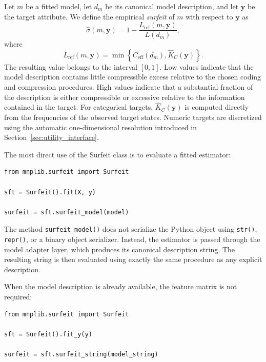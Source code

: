 Let $m$ be a fitted model, let $d_m$ be its canonical model description, and let $\mathbf{y}$ be the target attribute. We define the empirical \emph{surfeit} of $m$ with respect to $\mathbf{y}$ as
\[
\hat\sigma(m,\mathbf{y}) = 1 - \frac{L_{\mathrm{ref}}(m,\mathbf{y})}{L(d_m)},
\]
where
\[
L_{\mathrm{ref}}(m,\mathbf{y}) = \min\left\{C_{\mathrm{eff}}(d_m), \hat K_C(\mathbf{y})\right\}.
\]
The resulting value belongs to the interval $[0,1]$. Low values indicate that the model description contains little compressible excess relative to the chosen coding and compression procedures. High values indicate that a substantial fraction of the description is either compressible or excessive relative to the information contained in the target. For categorical targets, $\hat K_C(\mathbf{y})$ is computed directly from the frequencies of the observed target states. Numeric targets are discretized using the automatic one-dimensional resolution introduced in Section~\ref{sec:utility_interface}.

The most direct use of the Surfeit class is to evaluate a fitted estimator:

\begin{sourcecode}
{\scriptsize
\begin{verbatim}
from mnplib.surfeit import Surfeit

sft = Surfeit().fit(X, y)

surfeit = sft.surfeit_model(model)
\end{verbatim}
}
\end{sourcecode}

The method \texttt{surfeit\_model()} does not serialize the Python object using \texttt{str()}, \texttt{repr()}, or a binary object serializer. Instead, the estimator is passed through the model adapter layer, which produces its canonical description string. The resulting string is then evaluated using exactly the same procedure as any explicit description.

When the model description is already available, the feature matrix is not required:

\begin{sourcecode}
{\scriptsize
\begin{verbatim}
from mnplib.surfeit import Surfeit

sft = Surfeit().fit_y(y)

surfeit = sft.surfeit_string(model_string)
\end{verbatim}
}
\end{sourcecode}

